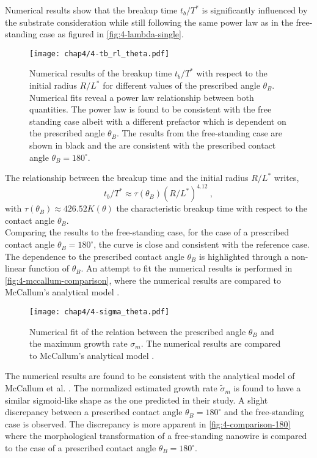 Numerical results show that the breakup time $t_b/T^*$ is significantly influenced by the substrate consideration while still following the same power law as in the free-standing case as figured in \autoref{fig:4-lambda-single}. 
\begin{figure}[!htbp]
    \centering
    \texttt{[image: chap4/4-tb\_rl\_theta.pdf]}
    \caption{Numerical results of the breakup time $t_b/T^*$ with respect to the initial radius $R/L^*$ for different values of the prescribed angle $\theta_B$. Numerical fits reveal a power law relationship between both quantities. The power law is found to be consistent with the free standing case albeit with a different prefactor which is dependent on the prescribed angle $\theta_B$. The results from the free-standing case are shown in black and the are consistent with the prescribed contact angle $\theta_B=180^\circ$.}
    \label{fig:4-td-single}
\end{figure}
The relationship between the breakup time and the initial radius $R/L^*$ writes,
\begin{equation}
    t_b/T^* \approx \tau(\theta_B) (R/L^*)^{4.12}\ ,
\end{equation}
with $\tau(\theta_B)\approx 426.52 K(\theta)$ the characteristic breakup time with respect to the contact angle $\theta_B$.\\
Comparing the results to the free-standing case, for the case of a prescribed contact angle $\theta_B=180^\circ$, the curve is close and consistent with the reference case. The dependence to the prescribed contact angle $\theta_B$ is highlighted through a non-linear function of $\theta_B$. An attempt to fit the numerical results is performed in \autoref{fig:4-mccallum-comparison}, where the numerical results are compared to McCallum's analytical model \cite{McCallumVoorheesMiksisDavisWong1996}.
\begin{figure}[!htbp]
    \centering
    \texttt{[image: chap4/4-sigma\_theta.pdf]}
    \caption{Numerical fit of the relation between the prescribed angle $\theta_B$ and the maximum growth rate $\sigma_m$. The numerical results are compared to McCallum's analytical model \cite{McCallumVoorheesMiksisDavisWong1996}.}
    \label{fig:4-mccallum-comparison}
\end{figure}
The numerical results are found to be consistent with the analytical model of McCallum et al. \cite{McCallumVoorheesMiksisDavisWong1996}. The normalized estimated growth rate $\tilde{\sigma}_m$ is found to have a similar sigmoid-like shape as the one predicted in their study.
A slight discrepancy between a prescribed contact angle $\theta_B=180^\circ$ and the free-standing case is observed. The discrepancy is more apparent in \autoref{fig:4-comparison-180} where the morphological transformation of a free-standing nanowire is compared to the case of a prescribed contact angle $\theta_B=180^\circ$.

